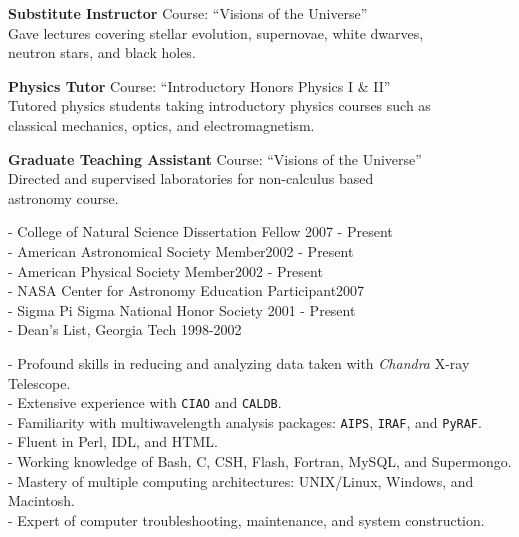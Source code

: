 \documentclass[11pt]{cv}
\begin{document}
\begin{llist}

{\sc \bf{Substitute Instructor}}
Course: ``Visions of the Universe''\\
Gave lectures covering stellar evolution, supernovae, white dwarves,\\
neutron stars, and black holes.

{\sc \bf{Physics Tutor}}
Course: ``Introductory Honors Physics I \& II''\\
Tutored physics students taking introductory physics courses such as\\
classical mechanics, optics, and electromagnetism.

{\sc \bf{Graduate Teaching Assistant}}
Course: ``Visions of the Universe''\\
Directed and supervised laboratories for non-calculus based\\
astronomy course.


- College of Natural Science Dissertation Fellow \hfill 2007 - Present\\
- American Astronomical Society Member\hfill 2002 - Present\\
- American Physical Society Member\hfill 2002 - Present\\
- NASA Center for Astronomy Education Participant\hfill 2007\\
- Sigma Pi Sigma National Honor Society \hfill 2001 - Present\\
- Dean's List, Georgia Tech \hfill 1998-2002


- Profound skills in reducing and analyzing data taken with {\textit{Chandra}} X-ray Telescope.\\
- Extensive experience with {\tt{CIAO}} and {\tt{CALDB}}.\\
- Familiarity with multiwavelength analysis packages: {\tt{AIPS}}, {\tt{IRAF}}, and {\tt{PyRAF}}.\\
- Fluent in Perl, IDL, and HTML.\\
- Working knowledge of Bash, C, CSH, Flash, Fortran, MySQL, and Supermongo.\\
- Mastery of multiple computing architectures: UNIX/Linux, Windows, and Macintosh.\\
- Expert of computer troubleshooting, maintenance, and system construction.


\end{llist}
\end{document}
